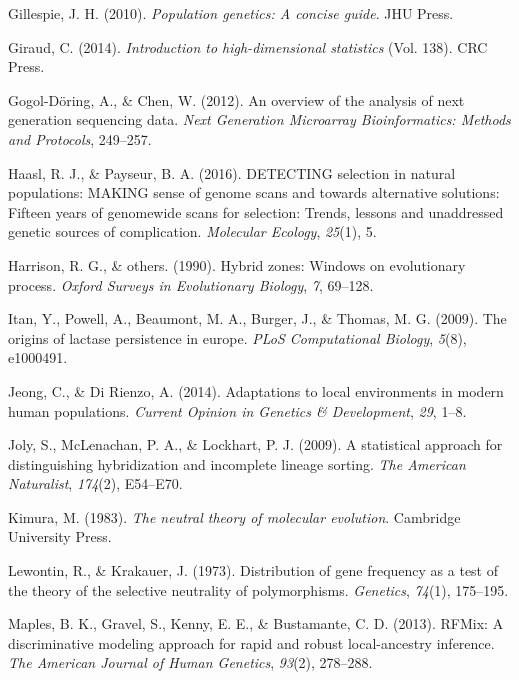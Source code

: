 \documentclass[12pt,a4paper,twoside]{ugathesis}
\theoremstyle{definition}
\theoremstyle{definition}
\theoremstyle{remark}
\begin{document}
\hypertarget{ref-gillespie2010population}{}
Gillespie, J. H. (2010). \emph{Population genetics: A concise guide}.
JHU Press.

\hypertarget{ref-giraud2014introduction}{}
Giraud, C. (2014). \emph{Introduction to high-dimensional statistics}
(Vol. 138). CRC Press.

\hypertarget{ref-gogol2012overview}{}
Gogol-Döring, A., \& Chen, W. (2012). An overview of the analysis of
next generation sequencing data. \emph{Next Generation Microarray
Bioinformatics: Methods and Protocols}, 249--257.

\hypertarget{ref-haasl2016detecting}{}
Haasl, R. J., \& Payseur, B. A. (2016). DETECTING selection in natural
populations: MAKING sense of genome scans and towards alternative
solutions: Fifteen years of genomewide scans for selection: Trends,
lessons and unaddressed genetic sources of complication. \emph{Molecular
Ecology}, \emph{25}(1), 5.

\hypertarget{ref-harrison1990hybrid}{}
Harrison, R. G., \& others. (1990). Hybrid zones: Windows on
evolutionary process. \emph{Oxford Surveys in Evolutionary Biology},
\emph{7}, 69--128.

\hypertarget{ref-itan2009origins}{}
Itan, Y., Powell, A., Beaumont, M. A., Burger, J., \& Thomas, M. G.
(2009). The origins of lactase persistence in europe. \emph{PLoS
Computational Biology}, \emph{5}(8), e1000491.

\hypertarget{ref-jeong2014adaptations}{}
Jeong, C., \& Di Rienzo, A. (2014). Adaptations to local environments in
modern human populations. \emph{Current Opinion in Genetics \&
Development}, \emph{29}, 1--8.

\hypertarget{ref-joly2009statistical}{}
Joly, S., McLenachan, P. A., \& Lockhart, P. J. (2009). A statistical
approach for distinguishing hybridization and incomplete lineage
sorting. \emph{The American Naturalist}, \emph{174}(2), E54--E70.

\hypertarget{ref-kimura1983neutral}{}
Kimura, M. (1983). \emph{The neutral theory of molecular evolution}.
Cambridge University Press.

\hypertarget{ref-lewontin1973distribution}{}
Lewontin, R., \& Krakauer, J. (1973). Distribution of gene frequency as
a test of the theory of the selective neutrality of polymorphisms.
\emph{Genetics}, \emph{74}(1), 175--195.

\hypertarget{ref-maples2013rfmix}{}
Maples, B. K., Gravel, S., Kenny, E. E., \& Bustamante, C. D. (2013).
RFMix: A discriminative modeling approach for rapid and robust
local-ancestry inference. \emph{The American Journal of Human Genetics},
\emph{93}(2), 278--288.
\end{document}
